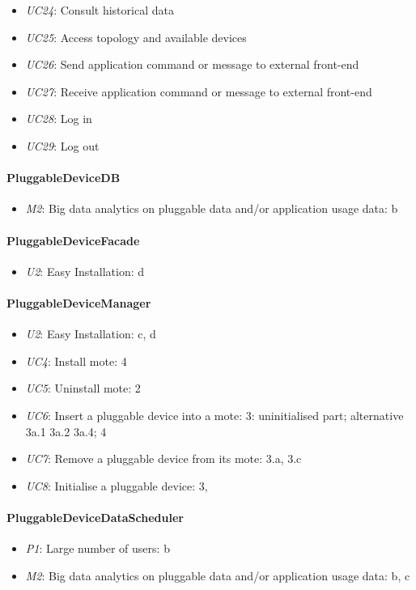 \begin{itemize}
            \item \emph{UC24}: Consult historical data
            \item \emph{UC25}: Access topology and available devices
            \item \emph{UC26}: Send application command or message to external front-end
            \item \emph{UC27}: Receive application command or message to external front-end
            \item \emph{UC28}: Log in
            \item \emph{UC29}: Log out
        \end{itemize}

    \paragraph{PluggableDeviceDB}
        \begin{itemize}
            \item \emph{M2}: Big data analytics on pluggable data and/or application usage data: b
        \end{itemize}

    \paragraph{PluggableDeviceFacade}
        \begin{itemize}
        	\item \emph{U2}: Easy Installation: d
        \end{itemize}

    \paragraph{PluggableDeviceManager}
        \begin{itemize}
            \item \emph{U2}: Easy Installation: c, d
            \item \emph{UC4}: Install mote: 4
            \item \emph{UC5}: Uninstall mote: 2
            \item \emph{UC6}: Insert a pluggable device into a mote: 3: uninitialised part; alternative 3a.1 3a.2 3a.4; 4
            \item \emph{UC7}: Remove a pluggable device from its mote: 3.a, 3.c
            \item \emph{UC8}: Initialise a pluggable device: 3,
        \end{itemize}

    \paragraph{PluggableDeviceDataScheduler}
        \begin{itemize}
            \item \emph{P1}: Large number of users: b
            \item \emph{M2}: Big data analytics on pluggable data and/or application usage data: b, c
        \end{itemize}
